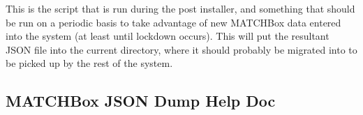 \documentclass[letterpaper,10pt,english]{sphinxmanual}
\begin{document}
This is the script that is run during the post installer, and something that
should be run on a periodic basis to take advantage of new MATCHBox data entered
into the system (at least until lockdown occurs).  This will put the resultant
JSON file into the current directory, where it should probably be migrated into
 to be picked up by the rest of the system.


\subsection{MATCHBox JSON Dump Help Doc}
\label{\detokenize{helper_scripts:matchbox-json-dump-help-doc}}
%
\begin{sphinxVerbatim}[commandchars=\\\{\}]
     \PYG{p}{[}\PYG{p}{]} \PYG{p}{[} \PYG{p}{]} \PYG{p}{[}\PYG{p}{]} \PYG{p}{[} \PYG{p}{]}
    \PYG{p}{[} \PYG{p}{]} \PYG{p}{[} \PYG{p}{]}
    \PYG{p}{[} \PYG{p}{]} \PYG{p}{[}\PYG{p}{]}


\end{sphinxVerbatim}
\end{document}
